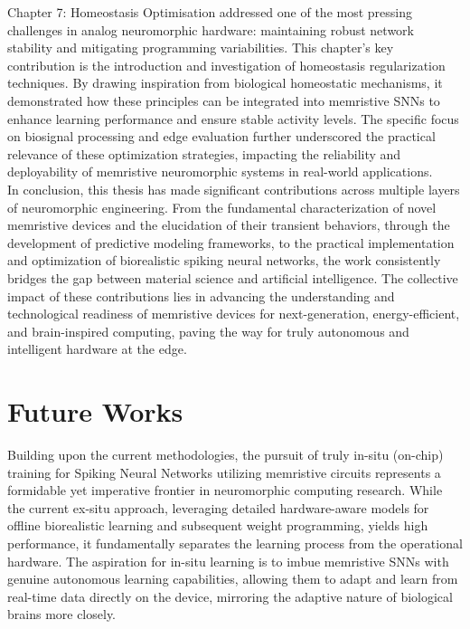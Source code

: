 \noindent Chapter 7: Homeostasis Optimisation addressed one of the most pressing challenges in analog neuromorphic hardware: maintaining robust network stability and mitigating programming variabilities. This chapter's key contribution is the introduction and investigation of homeostasis regularization techniques. By drawing inspiration from biological homeostatic mechanisms, it demonstrated how these principles can be integrated into memristive SNNs to enhance learning performance and ensure stable activity levels. The specific focus on biosignal processing and edge evaluation further underscored the practical relevance of these optimization strategies, impacting the reliability and deployability of memristive neuromorphic systems in real-world applications.\\

\noindent In conclusion, this thesis has made significant contributions across multiple layers of neuromorphic engineering. From the fundamental characterization of novel memristive devices and the elucidation of their transient behaviors, through the development of predictive modeling frameworks, to the practical implementation and optimization of biorealistic spiking neural networks, the work consistently bridges the gap between material science and artificial intelligence. The collective impact of these contributions lies in advancing the understanding and technological readiness of memristive devices for next-generation, energy-efficient, and brain-inspired computing, paving the way for truly autonomous and intelligent hardware at the edge.

\section[Future Works]{Future Works}

\noindent Building upon the current methodologies, the pursuit of truly in-situ (on-chip) training for Spiking Neural Networks utilizing memristive circuits represents a formidable yet imperative frontier in neuromorphic computing research. While the current ex-situ approach, leveraging detailed hardware-aware models for offline biorealistic learning and subsequent weight programming, yields high performance, it fundamentally separates the learning process from the operational hardware. The aspiration for in-situ learning is to imbue memristive SNNs with genuine autonomous learning capabilities, allowing them to adapt and learn from real-time data directly on the device, mirroring the adaptive nature of biological brains more closely. \\

